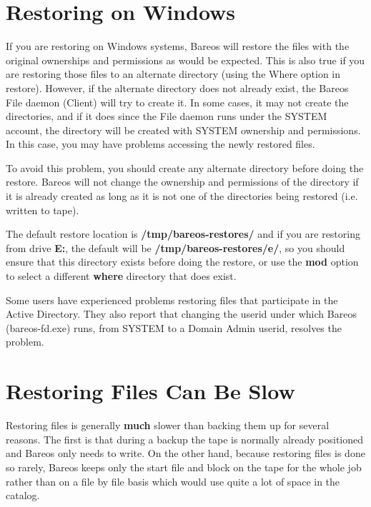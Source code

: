 \label{Windows}
\section{Restoring on Windows}

If you are restoring on Windows systems, Bareos will restore the files
with the original ownerships and permissions as would be expected.  This is
also true if you are restoring those files to an alternate directory (using
the Where option in restore).  However, if the alternate directory does not
already exist, the Bareos File daemon (Client) will try to create it.  In
some cases, it may not create the directories, and if it does since the
File daemon runs under the SYSTEM account, the directory will be created
with SYSTEM ownership and permissions.  In this case, you may have problems
accessing the newly restored files.

To avoid this problem, you should create any alternate directory before
doing the restore.  Bareos will not change the ownership and permissions of
the directory if it is already created as long as it is not one of the
directories being restored (i.e.  written to tape).

The default restore location is {\bf /tmp/bareos-restores/} and if you are
restoring from drive {\bf E:}, the default will be
{\bf /tmp/bareos-restores/e/}, so you should ensure that this directory
exists before doing the restore, or use the {\bf mod} option to
select a different {\bf where} directory that does exist.

Some users have experienced problems restoring files that participate in
the Active Directory. They also report that changing the userid under which
Bareos (bareos-fd.exe) runs, from SYSTEM to a Domain Admin userid, resolves
the problem.


\section{Restoring Files Can Be Slow}




Restoring files is generally {\bf much} slower than backing them up for several
reasons. The first is that during a backup the tape is normally already
positioned and Bareos only needs to write. On the other hand, because restoring
files is done so rarely, Bareos keeps only the start file and block on the
tape for the whole job rather than on a file by file basis which would use
quite a lot of space in the catalog.

